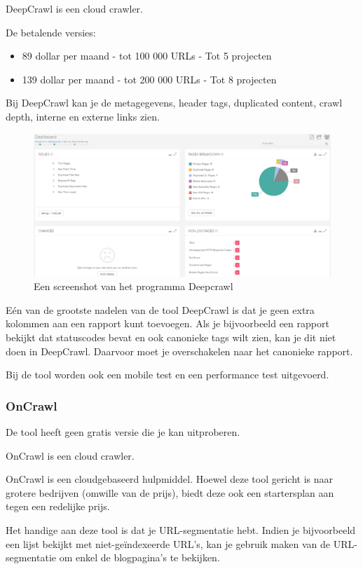 DeepCrawl is een cloud crawler. 

De betalende versies: 
\begin{itemize}
\item 89 dollar per maand - tot 100 000 URLs - Tot 5 projecten
\item 139 dollar per maand - tot 200 000 URLs - Tot 8 projecten
\end{itemize}

Bij DeepCrawl kan je de metagegevens, header tags, duplicated content, crawl depth, interne en externe links zien. 

\begin{figure}[h!]
\centering
\includegraphics[width=\linewidth]{img/deepcrawl.PNG}
\caption{Een screenshot van het programma Deepcrawl
\autocite{deepcrawl}}
\end{figure}

Eén van de grootste nadelen van de tool DeepCrawl is dat je geen extra kolommen aan een rapport kunt toevoegen. Als je bijvoorbeeld een rapport bekijkt dat statuscodes bevat en ook canonieke tags wilt zien, kan je dit niet doen in DeepCrawl. Daarvoor moet je overschakelen naar het canonieke rapport.

Bij de tool worden ook een mobile test en een performance test uitgevoerd.

\subsubsection{OnCrawl}
\label{ch: OnCrawl}
De tool heeft geen gratis versie die je kan uitproberen. 

OnCrawl is een cloud crawler. 

OnCrawl is een cloudgebaseerd hulpmiddel. Hoewel deze tool gericht is naar grotere bedrijven (omwille van de prijs), biedt deze ook een startersplan aan tegen een redelijke prijs. 

Het handige aan deze tool is dat je URL-segmentatie hebt. Indien je bijvoorbeeld een lijst bekijkt met niet-geïndexeerde URL's, kan je gebruik maken van de URL-segmentatie om enkel de blogpagina's te bekijken. 

